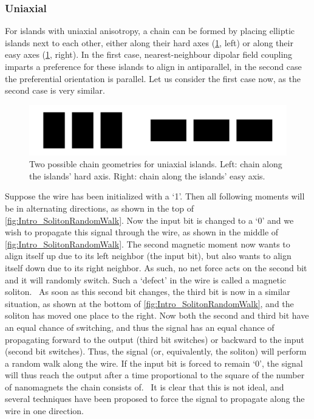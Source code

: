 \documentclass[11pt,a4paper,english]{article}
\begin{document}
\subsubsection{Uniaxial}
For islands with uniaxial anisotropy, a chain can be formed by placing elliptic islands next to each other, either along their hard axes (\cref{fig:Intro_IslandEllipticChainGeometries}, left) or along their easy axes (\cref{fig:Intro_IslandEllipticChainGeometries}, right). In the first case, nearest-neighbour dipolar field coupling imparts a preference for these islands to align in antiparallel, in the second case the preferential orientation is parallel. Let us consider the first case now, as the second case is very similar. %
\begin{figure}
    \centering
    \includegraphics[width=0.5\columnwidth]{Figures/Introduction/Chains_geometries.pdf}
    \caption{Two possible chain geometries for uniaxial islands. Left: chain along the islands' hard axis. Right: chain along the islands' easy axis.}
    \label{fig:Intro_IslandEllipticChainGeometries}
\end{figure}
Suppose the wire has been initialized with a `1'. Then all following moments will be in alternating directions, as shown in the top of \cref{fig:Intro_SolitonRandomWalk}. Now the input bit is changed to a `0' and we wish to propagate this signal through the wire, as shown in the middle of \cref{fig:Intro_SolitonRandomWalk}. The second magnetic moment now wants to align itself up due to its left neighbor (the input bit), but also wants to align itself down due to its right neighbor. As such, no net force acts on the second bit and it will randomly switch. Such a `defect' in the wire is called a magnetic soliton.~\cite{MQCA_RoomTemp} As soon as this second bit changes, the third bit is now in a similar situation, as shown at the bottom of \cref{fig:Intro_SolitonRandomWalk}, and the soliton has moved one place to the right. Now both the second and third bit have an equal chance of switching, and thus the signal has an equal chance of propagating forward to the output (third bit switches) or backward to the input (second bit switches). Thus, the signal (or, equivalently, the soliton) will perform a random walk along the wire. If the input bit is forced to remain `0', the signal will thus reach the output after a time proportional to the square of the number of nanomagnets the chain consists of.~\cite{Wolfram_RandomWalk} It is clear that this is not ideal, and several techniques have been proposed to force the signal to propagate along the wire in one direction. 
\end{document}
